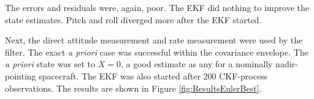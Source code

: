 \documentclass[]{aiaa-tc}%
\begin{document}
The errors and residuals were, again, poor. The EKF did nothing to improve the state estimates. Pitch and roll diverged more after the EKF started.

	\vspace{5 mm}

Next, the direct attitude measurement and rate measurement were used by the filter. The exact \textit{a priori} case was successful within the covariance envelope. The \textit{a priori} state was set to $X=0$, a good estimate as any for a nominally nadir-pointing spacecraft. The EKF was also started after 200 CKF-process observations. The results are shown in Figure \ref{fig:ResultsEulerBest}.
	\begin{figure}[H]
		\centering
\end{figure}
\end{document}
